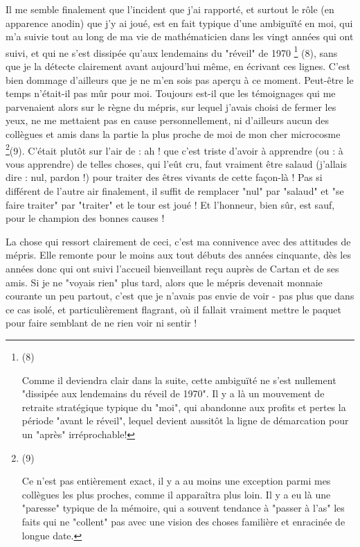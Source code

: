 Il me semble finalement que l'incident que j'ai rapporté, et surtout le rôle (en apparence anodin) que j'y ai joué, est en fait typique d'une ambiguïté en moi, qui m'a suivie tout au long de ma vie de mathématicien dans les vingt années qui ont suivi, et qui ne s'est dissipée qu'aux lendemains du "réveil" de 1970 \footnote{(8)\par Comme il deviendra clair dans la suite, cette ambiguïté ne s'est nullement "dissipée aux lendemains du réveil de 1970". Il y a là un mouvement de retraite stratégique typique du "moi", qui abandonne aux profits et pertes la période "avant le réveil", lequel devient aussitôt la ligne de démarcation pour un "après" irréprochable!} (8), sans que je la détecte clairement avant aujourd'hui même, en écrivant ces lignes. C'est bien dommage d'ailleurs que je ne m'en sois pas aperçu à ce moment. Peut-être le temps n'était-il pas mûr pour moi. Toujours est-il que les témoignages qui me parvenaient alors sur le règne du mépris, sur lequel j'avais choisi de fermer les yeux, ne me mettaient pas en cause personnellement, ni d'ailleurs aucun des collègues et amis dans la partie la plus proche de moi de mon cher microcosme \footnote{(9)\par Ce n'est pas entièrement exact, il y a au moins une exception parmi mes collègues les plus proches, comme il apparaîtra plus loin. Il y a eu là une "paresse" typique de la mémoire, qui a souvent tendance à "passer à l'as" les faits qui ne "collent" pas avec une vision des choses familière et enracinée de longue date.}(9). C'était plutôt sur l'air de : ah ! que c'est triste d'avoir à apprendre (ou : à vous apprendre) de telles choses, qui l'eût cru, faut vraiment être salaud (j'allais dire : nul, pardon !) pour traiter des êtres vivants de cette façon-là ! Pas si différent de l'autre air finalement, il suffit de remplacer "nul" par "salaud" et "se faire traiter" par "traiter" et le tour est joué ! Et l'honneur, bien sûr, est sauf, pour le champion des bonnes causes !

La chose qui ressort clairement de ceci, c'est ma connivence avec des attitudes de mépris. Elle remonte pour le moins aux tout débuts des années cinquante, dès les années donc qui ont suivi l'accueil bienveillant reçu auprès de Cartan et de ses amis. Si je ne "voyais rien" plus tard, alors que le mépris devenait monnaie courante un peu partout, c'est que je n'avais pas envie de voir - pas plus que dans ce cas isolé, et particulièrement flagrant, où il fallait vraiment mettre le paquet pour faire semblant de ne rien voir ni sentir !


